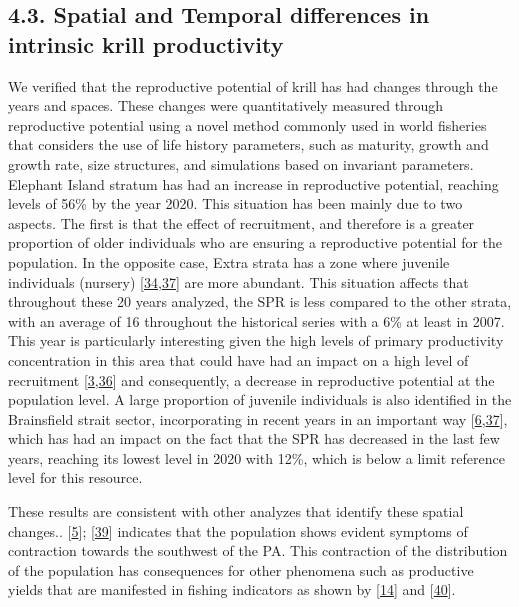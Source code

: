 \documentclass[
]{article}
\begin{document}
\hypertarget{spatial-and-temporal-differences-in-intrinsic-krill-productivity}{%
\subsection{4.3. Spatial and Temporal differences in intrinsic krill
productivity}\label{spatial-and-temporal-differences-in-intrinsic-krill-productivity}}

We verified that the reproductive potential of krill has had changes
through the years and spaces. These changes were quantitatively measured
through reproductive potential using a novel method commonly used in
world fisheries that considers the use of life history parameters, such
as maturity, growth and growth rate, size structures, and simulations
based on invariant parameters. Elephant Island stratum has had an
increase in reproductive potential, reaching levels of 56\% by the year
2020. This situation has been mainly due to two aspects. The first is
that the effect of recruitment, and therefore is a greater proportion of
older individuals who are ensuring a reproductive potential for the
population. In the opposite case, Extra strata has a zone where juvenile
individuals (nursery)
{[}\protect\hyperlink{ref-Veytia2021}{34},\protect\hyperlink{ref-Perry2020}{37}{]}
are more abundant. This situation affects that throughout these 20 years
analyzed, the SPR is less compared to the other strata, with an average
of 16 throughout the historical series with a 6\% at least in 2007. This
year is particularly interesting given the high levels of primary
productivity concentration in this area that could have had an impact on
a high level of recruitment
{[}\protect\hyperlink{ref-Saba2014}{3},\protect\hyperlink{ref-Walsh2020}{36}{]}
and consequently, a decrease in reproductive potential at the population
level. A large proportion of juvenile individuals is also identified in
the Brainsfield strait sector, incorporating in recent years in an
important way
{[}\protect\hyperlink{ref-Reiss2020}{6},\protect\hyperlink{ref-Perry2020}{37}{]},
which has had an impact on the fact that the SPR has decreased in the
last few years, reaching its lowest level in 2020 with 12\%, which is
below a limit reference level for this resource.

These results are consistent with other analyzes that identify these
spatial changes.. {[}\protect\hyperlink{ref-Atkinson2009}{5}{]};
{[}\protect\hyperlink{ref-Atkinson2008}{39}{]} indicates that the
population shows evident symptoms of contraction towards the southwest
of the PA. This contraction of the distribution of the population has
consequences for other phenomena such as productive yields that are
manifested in fishing indicators as shown by
{[}\protect\hyperlink{ref-SantaCruz2022}{14}{]} and
{[}\protect\hyperlink{ref-Kruger2019}{40}{]}.
\end{document}
